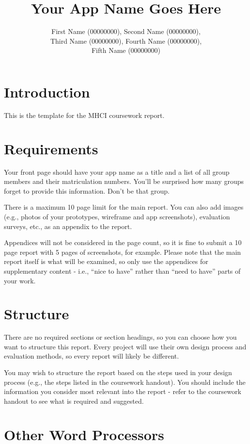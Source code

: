 \documentclass[a4,10pt,twocolumn]{article}
\author{
  First Name (00000000), Second Name (00000000),\\
  Third Name (00000000), Fourth Name (00000000),\\
  Fifth Name (00000000)}
\title{Your App Name Goes Here}
\date{} %
\begin{document}
\maketitle


\section*{Introduction}

This is the template for the MHCI coursework report.


\section*{Requirements}

Your front page should have your app name as a title and a list of all group members and their matriculation numbers. You'll be surprised how many groups forget to provide this information. Don't be that group.

There is a maximum 10 page limit for the main report. You can also add images (e.g., photos of your prototypes, wireframe and app screenshots), evaluation surveys, etc., as an appendix to the report.

Appendices will not be considered in the page count, so it is fine to submit a 10 page report with 5 pages of screenshots, for example. Please note that the main report itself is what will be examined, so only use the appendices for supplementary content - i.e., ``nice to have'' rather than ``need to have'' parts of your work.


\section*{Structure}

There are no required sections or section headings, so you can choose how you want to structure this report. Every project will use their own design process and evaluation methods, so every report will likely be different.

You may wish to structure the report based on the steps used in your design process (e.g., the steps listed in the coursework handout). You should include the information you consider most relevant into the report - refer to the coursework handout to see what is required and suggested.


\section*{Other Word Processors}
\end{document}
